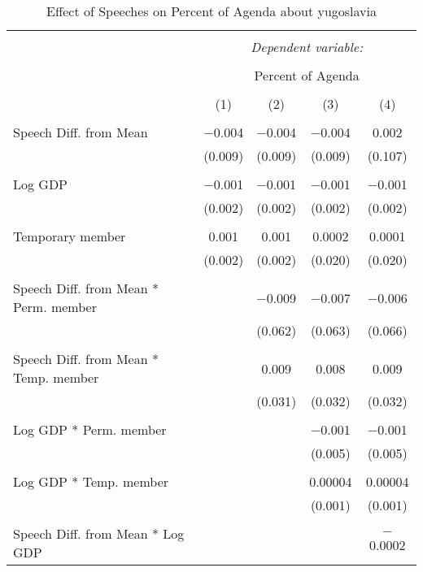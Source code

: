 
\begin{table}[!htbp] \centering 
  \caption{Effect of Speeches on Percent of Agenda about yugoslavia} 
  \label{} 
\begin{tabular}{@{\extracolsep{5pt}}lcccc} 
\\[-1.8ex]\hline 
\hline \\[-1.8ex] 
 & \multicolumn{4}{c}{\textit{Dependent variable:}} \\ 
\cline{2-5} 
\\[-1.8ex] & \multicolumn{4}{c}{Percent of Agenda} \\ 
\\[-1.8ex] & (1) & (2) & (3) & (4)\\ 
\hline \\[-1.8ex] 
 Speech Diff. from Mean & $-$0.004 & $-$0.004 & $-$0.004 & 0.002 \\ 
  & (0.009) & (0.009) & (0.009) & (0.107) \\ 
  & & & & \\ 
 Log GDP & $-$0.001 & $-$0.001 & $-$0.001 & $-$0.001 \\ 
  & (0.002) & (0.002) & (0.002) & (0.002) \\ 
  & & & & \\ 
 Temporary member & 0.001 & 0.001 & 0.0002 & 0.0001 \\ 
  & (0.002) & (0.002) & (0.020) & (0.020) \\ 
  & & & & \\ 
 Speech Diff. from Mean * Perm. member &  & $-$0.009 & $-$0.007 & $-$0.006 \\ 
  &  & (0.062) & (0.063) & (0.066) \\ 
  & & & & \\ 
 Speech Diff. from Mean * Temp. member &  & 0.009 & 0.008 & 0.009 \\ 
  &  & (0.031) & (0.032) & (0.032) \\ 
  & & & & \\ 
 Log GDP * Perm. member &  &  & $-$0.001 & $-$0.001 \\ 
  &  &  & (0.005) & (0.005) \\ 
  & & & & \\ 
 Log GDP * Temp. member &  &  & 0.00004 & 0.00004 \\ 
  &  &  & (0.001) & (0.001) \\ 
  & & & & \\ 
 Speech Diff. from Mean * Log GDP &  &  &  & $-$0.0002 \\ 

\end{tabular}
\end{table}
